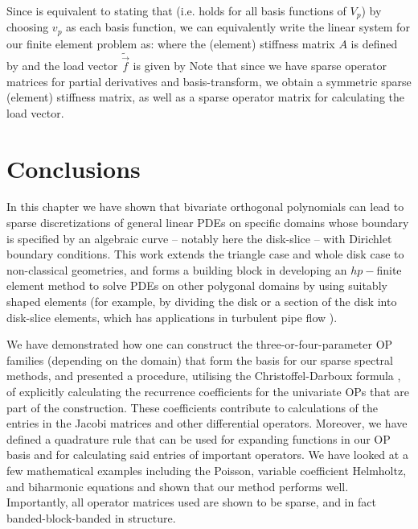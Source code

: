 Since  is equivalent to stating that
(i.e. holds for all basis functions of $V_p$) by choosing $v_p$ as each basis function, we can equivalently write the linear system for our finite element problem as:
where the (element) stiffness matrix $A$ is defined by 
and the load vector $\tilde{\vec{f}}$ is given by 
Note that since we have sparse operator matrices for partial derivatives and basis-transform, we obtain a symmetric sparse (element) stiffness matrix, as well as a sparse operator matrix for calculating the load vector.



\section{Conclusions}

In this chapter we have shown that bivariate orthogonal polynomials can lead to sparse discretizations of general linear PDEs on specific domains whose boundary is specified by an algebraic curve -- notably here the disk-slice -- with Dirichlet boundary conditions. This work extends the triangle case \cite{beuchler2006new, li2010optimal, olver2019triangle} and whole disk case \cite{boyd2011comparing, vasil2016tensor} to non-classical geometries, and forms a building block in developing an $hp-$finite element method to solve PDEs on other polygonal domains by using suitably shaped elements (for example, by dividing the disk or a section of the disk into disk-slice elements, which has applications in turbulent pipe flow \cite{eggels1994fully, kerswell2005recent, vasil2016tensor}).

We have demonstrated how one can construct the three-or-four-parameter OP families (depending on the domain) that form the basis for our sparse spectral methods, and presented a procedure, utilising the Christoffel-Darboux formula \cite[(18.2.12)]{DLMF}, of explicitly calculating the recurrence coefficients for the univariate OPs that are part of the construction. These coefficients contribute to calculations of the entries in the Jacobi matrices and other differential operators. Moreover, we have defined a quadrature rule that can be used for expanding functions in our OP basis and for calculating said entries of important operators. We have looked at a few mathematical examples including the Poisson, variable coefficient Helmholtz, and biharmonic equations and shown that our method performs well. Importantly, all operator matrices used are shown to be sparse, and in fact banded-block-banded in structure.

